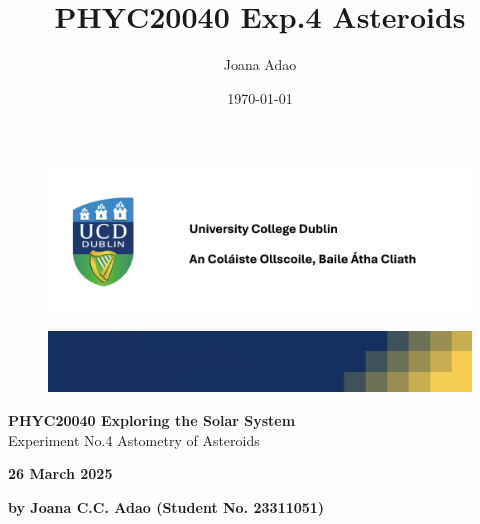 \documentclass[12pt]{article}
\title{PHYC20040 Exp.4 Asteroids}
\author{Joana Adao}
\date{\today}
\begin{document}
\begin{titlepage}
    \begin{center}

        \begin{figure}[ht]
            \includegraphics[width=\textwidth]{UCDLogo.png}
        \end{figure}
        
        \begin{figure}
            \centerline{\includegraphics[width=\paperwidth]{UCDBanner.png}}
        \end{figure}

        \vspace{4cm}

        {\LARGE \bfseries PHYC20040 Exploring the Solar System}\\
        \vspace{0.75cm}
        {\Large Experiment No.4 Astometry of Asteroids}
        
        \vspace{1cm}
    
    {\Large \textbf{26 March 2025}}

    \vspace{2cm}
    
    {\large \textbf{by Joana C.C. Adao (Student No. 23311051)}}\\

    \end{center}
    
   \clearpage

\end{titlepage}

\setcounter{page}{1}
\tableofcontents
{}

\newpage

\begin{abstract}



 
\end{abstract}
\end{document}
